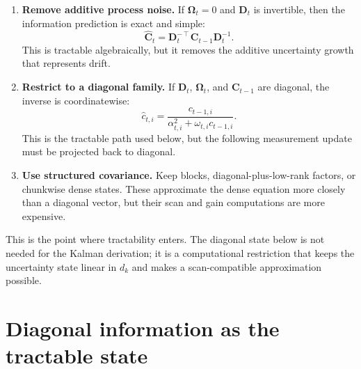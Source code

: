 \documentclass[11pt]{article}
\newcommand{\R}{\mathbb{R}}
\newcommand{\ve}[1]{\boldsymbol{#1}}
\newcommand{\tr}{\intercal}
\begin{document}
\begin{enumerate}[leftmargin=1.6em,itemsep=3pt]
  The memory cost is the main practical obstacle. At autoregressive inference time, a dense
  covariance filter stores one $\ve{P}_t\in\R^{d_k\times d_k}$ per head, i.e.\ $O(d_k^2)$
  uncertainty state instead of the $O(d_k)$ state of a diagonal tracker. In parallel training,
  a dense Riccati scan must materialize either dense prefix covariances or dense fractional-map
  scan elements for many tokens. Each token's fractional map is represented by a
  $2d_k\times 2d_k$ block matrix, equivalently four dense $d_k\times d_k$ blocks, so the
  scan state is still $O(d_k^2)$ per token. Across a length-$T$ sequence this is
  $O(Td_k^2)$ per head just for the uncertainty scan, before storing the usual key, value,
  gain, and memory-scan quantities. The diagonal approximation reduces this uncertainty-scan
  storage to $O(Td_k)$.

  \item \textbf{Remove additive process noise.} If $\ve{\Omega}_t=0$ and $\ve{D}_t$ is
  invertible, then the information prediction is exact and simple:
  \[
    \widehat{\ve{C}}_t=\ve{D}_t^{-\tr}\ve{C}_{t-1}\ve{D}_t^{-1}.
  \]
  This is tractable algebraically, but it removes the additive uncertainty growth that
  represents drift.

  \item \textbf{Restrict to a diagonal family.} If $\ve{D}_t$, $\ve{\Omega}_t$, and
  $\ve{C}_{t-1}$ are diagonal, the inverse is coordinatewise:
  \[
    \widehat{c}_{t,i}
    =
    \frac{c_{t-1,i}}{\alpha_{t,i}^2+\omega_{t,i}c_{t-1,i}}.
  \]
  This is the tractable path used below, but the following measurement update must be
  projected back to diagonal.

  \item \textbf{Use structured covariance.} Keep blocks, diagonal-plus-low-rank factors, or
  chunkwise dense states. These approximate the dense equation more closely than a diagonal
  vector, but their scan and gain computations are more expensive.
\end{enumerate}

This is the point where tractability enters. The diagonal state below is not needed for the
Kalman derivation; it is a computational restriction that keeps the uncertainty state
linear in $d_k$ and makes a scan-compatible approximation possible.

\section{Diagonal information as the tractable state}
\end{document}
